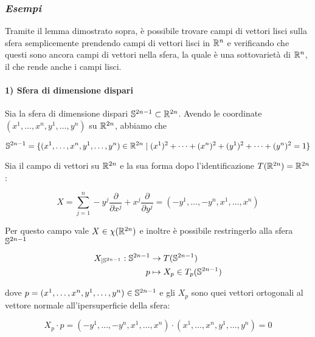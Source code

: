 \subsubsection{\textit{Esempi}}

Tramite il lemma dimostrato sopra, è possibile trovare campi di vettori lisci sulla sfera semplicemente prendendo campi di vettori lisci in $ \R^{n} $ e verificando che questi sono ancora campi di vettori nella sfera, la quale è una sottovarietà di $ \R^{n} $, il che rende anche i campi lisci.

\paragraph{1) Sfera di dimensione dispari}

Sia la sfera di dimensione dispari $ \S^{2n-1} \subset \R^{2n} $. Avendo le coordinate $ (x^{1},\dots,x^{n},y^{1},\dots,y^{n}) $ su $ \R^{2n} $, abbiamo che

\begin{equation}
	\S^{2n-1} = \{ (x^{1},\dots,x^{n},y^{1},\dots,y^{n}) \in \R^{2n} \mid (x^{1})^{2} + \cdots + (x^{n})^{2} + (y^{1})^{2} + \cdots + (y^{n})^{2} = 1 \}
\end{equation}

Sia il campo di vettori su $ \R^{2n} $ e la sua forma dopo l'identificazione $ T(\R^{2n}) = \R^{2n} $:

\begin{equation}
	X = \sum_{j=1}^{n} - y^{j} \dfrac{\partial}{\partial x^{j}} + x^{j} \dfrac{\partial}{\partial y^{j}} = (-y^{1},\dots,-y^{n},x^{1},\dots,x^{n})
\end{equation}

Per questo campo vale $ X \in \chi(\R^{2n}) $ e inoltre è possibile restringerlo alla sfera $ \S^{2n-1} $

\begin{align}
	\begin{split}
		X_{|\S^{2n-1}} : \S^{2n-1} &\to T(\S^{2n-1})\\
		p &\mapsto X_{p} \in T_{p}(\S^{2n-1})
	\end{split}
\end{align}

dove $ p = (x^{1},\dots,x^{n},y^{1},\dots,y^{n}) \in \S^{2n-1} $ e gli $ X_{p} $ sono quei vettori ortogonali al vettore normale all'ipersuperficie della sfera:

\begin{equation}
	X_{p} \cdot p = (-y^{1},\dots,-y^{n},x^{1},\dots,x^{n}) \cdot (x^{1},\dots,x^{n},y^{1},\dots,y^{n}) = 0
\end{equation}

